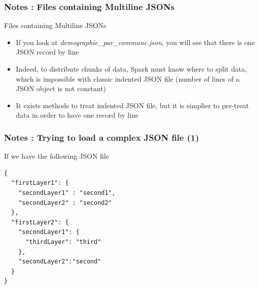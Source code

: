 \documentclass[slidetop,9pt,utf8]{beamer}
\begin{document}
\begin{frame}
  \frametitle{Notes : Files containing Multiline JSONs}

  \begin{exampleblock}{Files containing Multiline JSONs}
    \begin{itemize}
      \item If you look at \textit{demographie\_par\_commune.json}, you will see that there is one JSON record by line
      \item Indeed, to distribute chunks of data, Spark must know where to split data, which is impossible with classic indented JSON file (number of lines of a JSON object is not constant)
      \item It exists methods to treat indented JSON file, but it is simplier to pre-treat data in order to have one record by line
    \end{itemize}
  \end{exampleblock}

\end{frame}

\begin{frame}[fragile]
  \frametitle{Notes : Trying to load a complex JSON file (1)}

  \begin{exampleblock}{If we have the following JSON file}
    \begin{verbatim}
{
  "firstLayer1": {
    "secondLayer1" : "second1", 
    "secondLayer2" : "second2"
  }, 
  "firstLayer2": {
    "secondLayer1": {
      "thirdLayer": "third"
    }, 
    "secondLayer2":"second"
  }
}
    \end{verbatim}
  \end{exampleblock}
\end{frame}
\end{document}
